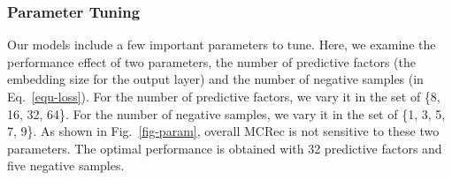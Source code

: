 

\subsubsection{Parameter Tuning} Our models include a few important parameters to tune. Here, we examine the performance effect of two parameters, \ie the number of predictive factors (the embedding size for the output layer) and the number of negative samples (in Eq.~\ref{equ-loss}).
For the number of predictive factors, we vary it in the set of \{8, 16, 32, 64\}. For the number of negative samples, we vary it in the set of \{1, 3, 5, 7, 9\}.
As shown in Fig.~\ref{fig-param}, overall MCRec is not sensitive to these two parameters. The optimal performance is obtained with 32 predictive factors and five negative samples.



